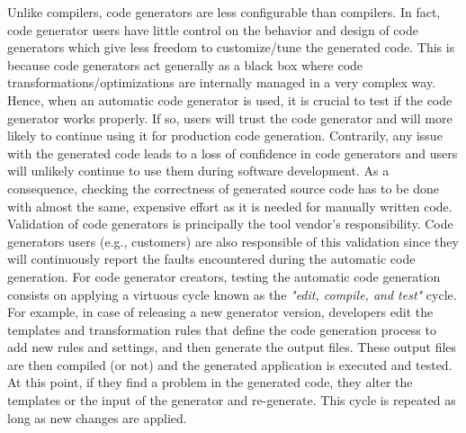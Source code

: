 
Unlike compilers, code generators are less configurable than compilers. In fact, code generator users have little control on the behavior and design of code generators which give less freedom to customize/tune the generated code. This is because code generators act generally as a black box where code transformations/optimizations are internally managed in a very complex way. Hence, when an automatic code generator is used, it is crucial to test if the code generator works properly. If so, users will trust the code generator and will more likely to continue using it for production code generation. Contrarily, any issue with the generated code leads to a loss of confidence in code generators and users will unlikely continue to use them during software development. As a consequence, checking the correctness of generated source code has to be done with almost the same, expensive effort as it is needed for manually written code.
Validation of code generators is principally the tool vendor's responsibility. Code generators users (e.g., customers) are also responsible of this validation since they will continuously report the faults encountered during the automatic code generation. 
For code generator creators, testing the automatic code generation consists on applying a virtuous cycle known as the \textit{"edit, compile, and test"} cycle. 
For example, in case of releasing a new generator version, developers edit the templates and transformation rules that define the code generation process to add new rules and settings, and then generate the output files. These output files are then compiled (or not) and the generated application is executed and tested. At this point, if they find a problem in the generated code, they alter the templates or the input of the generator and re-generate. This cycle is repeated as long as new changes are applied. 
